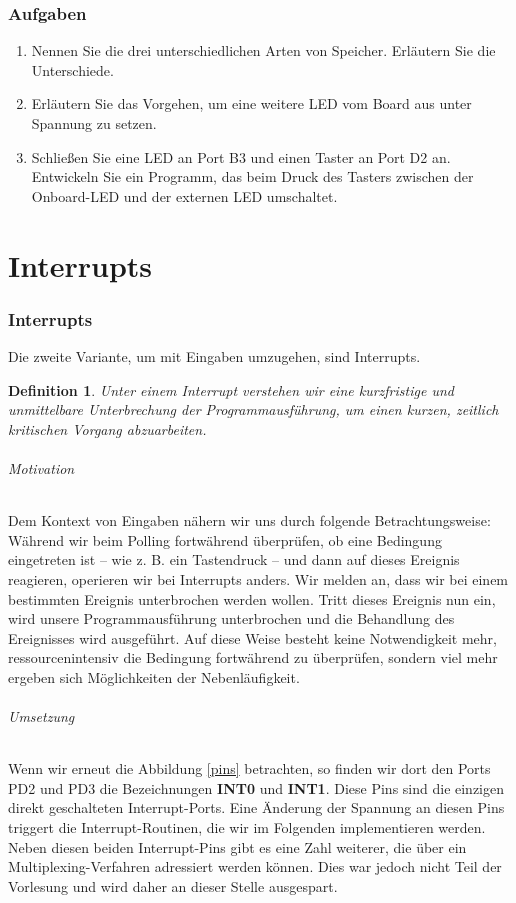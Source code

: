 \documentclass[11pt,a4paper]{scrartcl}
\newtheorem{definition}{Definition}
\begin{document}
\section*{Aufgaben}
\begin{enumerate}
\item Nennen Sie die drei unterschiedlichen Arten von Speicher. Erläutern Sie die Unterschiede.
\item Erläutern Sie das Vorgehen, um eine weitere LED vom Board aus unter Spannung zu setzen.
\item Schließen Sie eine LED an Port B3 und einen Taster an Port D2 an. Entwickeln Sie ein Programm, das beim Druck des Tasters zwischen der Onboard-LED und der externen LED umschaltet.
\end{enumerate}
\part{Interrupts}
\section{Interrupts}
Die zweite Variante, um mit Eingaben umzugehen, sind Interrupts. \\
\begin{definition}
Unter einem Interrupt verstehen wir eine kurzfristige und unmittelbare Unterbrechung der Programmausführung, um einen kurzen, zeitlich kritischen Vorgang abzuarbeiten.
\end{definition}
\paragraph{Motivation}
Dem Kontext von Eingaben nähern wir uns durch folgende Betrachtungsweise:
Während wir beim Polling fortwährend überprüfen, ob eine Bedingung eingetreten ist -- wie z. B. ein Tastendruck -- und dann auf dieses Ereignis reagieren, operieren wir bei Interrupts anders. Wir melden an, dass wir bei einem bestimmten Ereignis unterbrochen werden wollen. Tritt dieses Ereignis nun ein, wird unsere Programmausführung unterbrochen und die Behandlung des Ereignisses wird ausgeführt. Auf diese Weise besteht keine Notwendigkeit mehr, ressourcenintensiv die Bedingung fortwährend zu überprüfen, sondern viel mehr ergeben sich Möglichkeiten der Nebenläufigkeit. 
\paragraph{Umsetzung}
Wenn wir erneut die Abbildung \ref{pins} betrachten, so finden wir dort den Ports PD2 und PD3 die Bezeichnungen \textbf{INT0} und \textbf{INT1}. Diese Pins sind die einzigen direkt geschalteten Interrupt-Ports. Eine Änderung der Spannung an diesen Pins triggert die Interrupt-Routinen, die wir im Folgenden implementieren werden. Neben diesen beiden Interrupt-Pins gibt es eine Zahl weiterer, die über ein Multiplexing-Verfahren adressiert werden können. Dies war jedoch nicht Teil der Vorlesung und wird daher an dieser Stelle ausgespart. 
\end{document}
